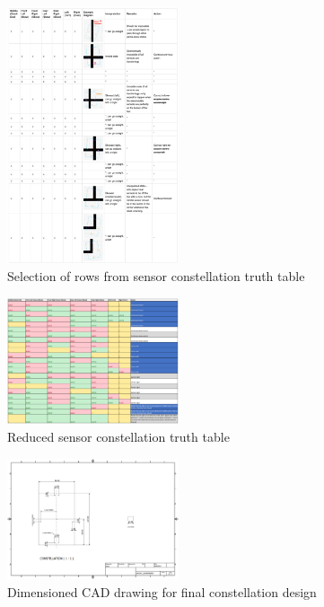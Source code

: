\documentclass[conference]{IEEEtran}
\begin{document}
\begin{figure}[htbp]
	\centerline{\includegraphics[width=0.45\textwidth]{sensor-table.png}}
	\caption{Selection of rows from sensor constellation truth table}
	\label{fig:sensor-table}
\end{figure}
\begin{figure}[htbp]
	\centerline{\includegraphics[width=0.45\textwidth]{sensor-table-reduced.png}}
	\caption{Reduced sensor constellation truth table}
	\label{fig:sensor-table-reduced}
\end{figure}

\begin{figure}[htbp]
	\centerline{\includegraphics[width=0.45\textwidth]{constellation-cad.png}}
	\caption{Dimensioned CAD drawing for final constellation design}
	\label{fig:constellation-cad}
\end{figure}
\end{document}
